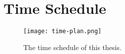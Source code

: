 \appendix
\chapter{Time Schedule}
\begin{figure}[H]
  \centering
  \texttt{[image: time-plan.png]}
  \caption{The time schedule of this thesis.}\label{fig:time-plan}
\end{figure}
